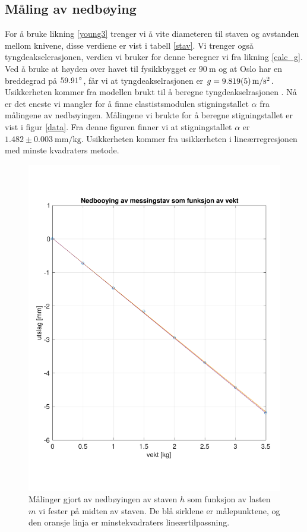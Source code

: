 \documentclass[%
 reprint,
 amsmath,amssymb,
 aps,
 norsk,
 booktabs
]{revtex4-1}
\begin{document}
\subsection{Måling av nedbøying}
For å bruke likning \eqref{young3} trenger vi å vite diameteren til staven og avstanden mellom knivene, disse verdiene er vist i tabell \vref{stav}. Vi trenger også tyngdeakselerasjonen, verdien vi bruker for denne beregner vi fra likning \eqref{calc_g}. Ved å bruke at høyden over havet til fysikkbygget er $\SI{90}{\meter}$ og at Oslo har en breddegrad på $59.91\degree$, får vi at tyngdeakselrasjonen er $g=\SI{9.819\pm0.005}{\meter\per\second^2}$. Usikkerheten kommer fra modellen brukt til å beregne tyngdeakselrasjonen \cite{gravity}.
Nå er det eneste vi mangler for å finne elastistsmodulen stigningstallet $\alpha$ fra målingene av nedbøyingen. Målingene vi brukte for å beregne stigningstallet er vist i figur \vref{data}. Fra denne figuren finner vi at stigningstallet $\alpha$ er $1.482\pm\SI{0.003}{\milli\meter\per\kilo\gram}$. Usikkerheten kommer fra usikkerheten i lineærregresjonen med minste kvadraters metode.
\begin{figure}[h!]
  \centering
  \includegraphics[scale=0.4]{nedbojing.pdf}
  \caption{Målinger gjort av nedbøyingen av staven $h$ som funksjon av lasten $m$ vi fester på midten av staven. De blå sirklene er målepunktene, og den oransje linja er minstekvadraters lineærtilpassning.}
  \label{data}
\end{figure}
\end{document}
